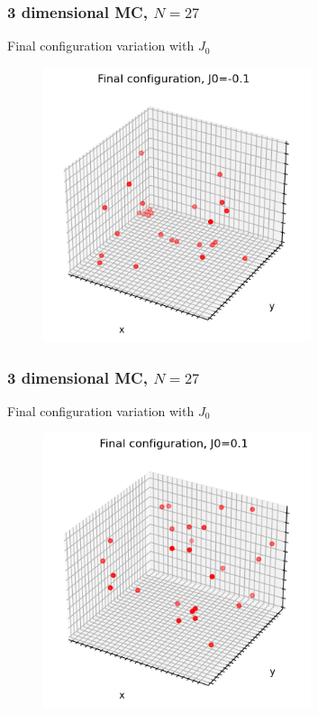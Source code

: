 \documentclass{beamer}
\begin{document}
\begin{frame}
\frametitle{3 dimensional MC, $N=27$}

\centering Final configuration variation with $J_0$

\begin{figure}
    \includegraphics[width=0.7\textwidth]{images/dfinalconf1.png}
\end{figure}

\end{frame}

\begin{frame}
    \frametitle{3 dimensional MC, $N=27$}

    \centering Final configuration variation with $J_0$

    \begin{figure}
        \includegraphics[width=0.7\textwidth]{images/dfinalconf2.png}
    \end{figure}

\end{frame}
\end{document}
